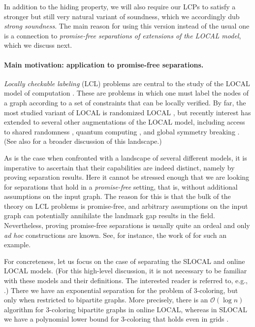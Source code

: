 \documentclass[11pt]{article}
\newcommand*{\cO}{\mathcal{O}}
\begin{document}
In addition to the hiding property, we will also require our LCPs to satisfy a
stronger but still very natural variant of soundness, which we accordingly dub
\emph{strong soundness}.
The main reason for using this version instead of the usual one is a connection
to \emph{promise-free separations of extensions of the LOCAL model}, which we
discuss next.

\paragraph{Main motivation: application to promise-free separations.}
\emph{Locally checkable labeling} (LCL) problems are central to the study of
the LOCAL model of computation
\cite{naor95_what_siamjc,linial92_locality_siamjc}.
These are problems in which one must label the nodes of a graph according to
a set of constraints that can be locally verified.
By far, the most studied variant of LOCAL is randomized LOCAL
\cite{ghaffari18_derandomizing_focs,balliu21_lower_jacm,balliu20_much_podc,%
brandt16_lower_stoc,chang19_exponential_siamjc,chang19_time_siamjc,%
fischer17_sublogarithmic_disc,rozhon20_polylogarithmic_stoc}, but recently
interest has extended to several other augmentations of the LOCAL model,
including access to shared randomness \cite{balliu24_shared_arxiv}, quantum
computing
\cite{legall19_quantum_stacs,coiteux-roy24_no_stoc,balliu25_distributed_stoc},
and global symmetry breaking
\cite{akbari23_locality_icalp,chang24_tight_podc,ghaffari17_complexity_stoc,%
ghaffari18_derandomizing_focs}.
(See also \cite{akbari25_online_stoc} for a broader discussion of this
landscape.)

As is the case when confronted with a landscape of several different models, it
is imperative to ascertain that their capabilities are indeed distinct, namely
by proving separation results.
Here it cannot be stressed enough that we are looking for separations that hold
in a \emph{promise-free} setting, that is, without additional assumptions on the
input graph.
The reason for this is that the bulk of the theory on LCL problems is
promise-free, and arbitrary assumptions on the input graph can potentially
annihilate the landmark gap results in the field.
Nevertheless, proving promise-free separations is usually quite an ordeal and
only \emph{ad hoc} constructions are known.
See, for instance, the work of \textcite{balliu24_shared_arxiv} for such an
example.

For concreteness, let us focus on the case of separating the SLOCAL and online
LOCAL models.
(For this high-level discussion, it is not necessary to be familiar with these
models and their definitions.
The interested reader is referred to, e.g., \textcite{akbari23_locality_icalp}.)
There we have an exponential separation for the problem of $3$-coloring, but
only when restricted to bipartite graphs.
More precisely, there is an $\cO(\log n)$ algorithm for $3$-coloring bipartite
graphs in online LOCAL, whereas in SLOCAL we have a polynomial lower bound for
$3$-coloring that holds even in grids \cite{akbari23_locality_icalp}.
\end{document}
